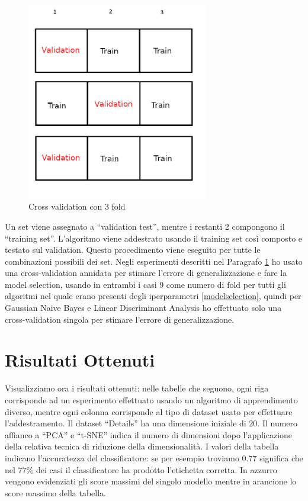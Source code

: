 \documentclass[12pt,italian]{report}
\begin{document}
\begin{figure}[h]
	\centering
	\includegraphics[width = 79mm]{immagini/cross-validation}
	\caption{Cross validation con 3 fold}
\end{figure}
Un set viene assegnato a ``validation test'', mentre i restanti 2 compongono il ``training set''. L'algoritmo viene addestrato usando il training set così composto e testato sul  validation. Questo procedimento viene eseguito per tutte le combinazioni possibili dei set.
Negli esperimenti descritti nel Paragrafo \ref{sec:risultati} ho usato una cross-validation annidata per stimare l'errore di generalizzazione e fare la model selection, usando in entrambi i casi 9 come numero di fold per tutti gli algoritmi nel quale erano presenti degli iperparametri \ref{modelselection}, quindi per Gaussian Naive Bayes e Linear Discriminant Analysis ho effettuato solo una cross-validation singola per stimare l'errore di generalizzazione.




\section{Risultati Ottenuti}
\label{sec:risultati}
Visualizziamo ora i risultati ottenuti: nelle tabelle che seguono, ogni riga corrisponde ad un esperimento effettuato usando un algoritmo di apprendimento diverso, mentre ogni colonna corrisponde al tipo di dataset usato per effettuare l'addestramento. Il dataset ``Details'' ha una dimensione iniziale di 20. Il numero affianco a ``PCA'' e ``t-SNE'' indica il numero di dimensioni dopo l'applicazione della relativa tecnica di riduzione della dimensionalità. I valori della tabella indicano l'accuratezza del classificatore: se per esempio troviamo $0.77$ significa che nel $77\%$ dei casi il classificatore ha prodotto l'etichetta corretta.
In azzurro vengono evidenziati gli score massimi del singolo modello mentre in arancione lo score massimo della tabella. 
\end{document}
